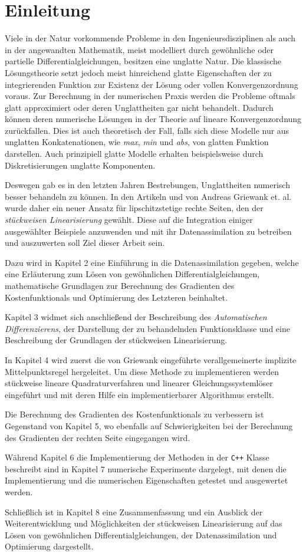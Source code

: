 \chapter{Einleitung}
Viele in der Natur vorkommende Probleme in den Ingenieursdisziplinen als auch in der angewandten Mathematik, meist modelliert durch gewöhnliche oder partielle Differentialgleichungen, besitzen eine unglatte Natur. Die klassische Lösungstheorie setzt jedoch meist hinreichend glatte Eigenschaften der zu integrierenden Funktion zur Existenz der Lösung oder vollen Konvergenzordnung voraus. Zur Berechnung in der numerischen Praxis werden die Probleme oftmals glatt approximiert oder deren Unglattheiten gar nicht behandelt. Dadurch können deren numerische Lösungen in der Theorie auf lineare Konvergenzordnung zurückfallen. Dies ist auch theoretisch der Fall, falls sich diese Modelle nur aus unglatten Konkatenationen, wie \textit{max}, \textit{min} und \textit{abs}, von glatten Funktion darstellen. Auch prinzipiell glatte Modelle erhalten beispielsweise durch Diskretisierungen unglatte Komponenten.

Deswegen gab es in den letzten Jahren Bestrebungen, Unglattheiten numerisch besser behandeln zu können. In den Artikeln \cite{monster} und \cite{plan} von Andreas Griewank et. al. wurde daher ein neuer Ansatz für lipschitzstetige rechte Seiten, den der \textit{stückweisen Linearisierung} gewählt. Diese auf die Integration einiger ausgewählter Beispiele anzuwenden und mit ihr Datenassimilation zu betreiben und auszuwerten soll Ziel dieser Arbeit sein.

Dazu wird in Kapitel 2 eine Einführung in die Datenassimilation gegeben, welche eine Erläuterung zum Lösen von gewöhnlichen Differentialgleichungen, mathematische Grundlagen zur Berechnung des Gradienten des Kostenfunktionals und Optimierung des Letzteren beinhaltet.

Kapitel 3 widmet sich anschließend der Beschreibung des \textit{Automatischen Differenzierens}, der Darstellung der zu behandelnden Funktionsklasse und eine Beschreibung der Grundlagen der stückweisen Linearisierung.

In Kapitel 4 wird zuerst die von Griewank eingeführte verallgemeinerte implizite Mittelpunktsregel hergeleitet. Um diese Methode zu implementieren werden stückweise lineare Quadraturverfahren und linearer Gleichungssystemlöser eingeführt und mit deren Hilfe ein implementierbarer Algorithmus erstellt.

Die Berechnung des Gradienten des Kostenfunktionals zu verbessern ist Gegenstand von Kapitel 5, wo ebenfalls auf Schwierigkeiten bei der Berechnung des Gradienten der rechten Seite eingegangen wird. 

Während Kapitel 6 die Implementierung der Methoden in der \texttt{C++} Klasse  beschreibt sind in Kapitel 7 numerische Experimente dargelegt, mit denen die Implementierung und die numerischen Eigenschaften getestet und ausgewertet werden.

Schließlich ist in Kapitel 8 eine Zusammenfassung und ein Ausblick der Weiterentwicklung und Möglichkeiten der stückweisen Linearisierung auf das Lösen von gewöhnlichen Differentialgleichungen, der Datenassimilation und Optimierung dargestellt.